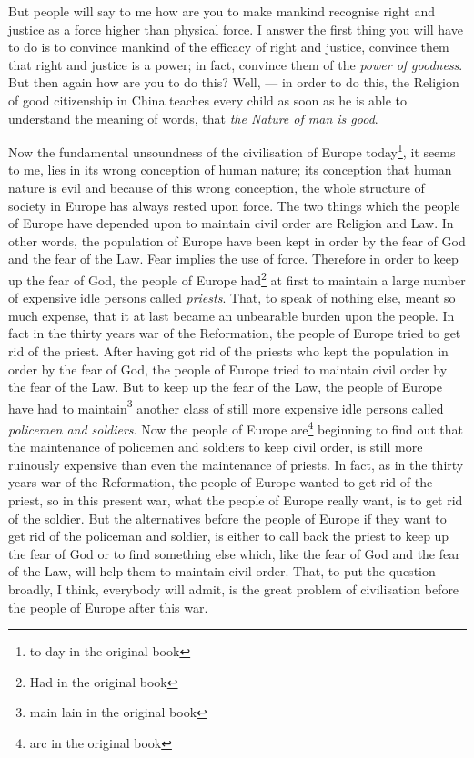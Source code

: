 But people will say to me how are you to make mankind recognise right and justice as a force higher than physical force.
I answer the first thing you will have to do is to convince mankind of the efficacy of right and justice, convince them that right and justice is a power; in fact, convince them of the \emph{power of goodness}.
But then again how are you to do this?
Well, --- in order to do this, the Religion of good citizenship in China teaches every child as soon as he is able to understand the meaning of words, that \emph{the Nature of man is good}\cite{num12}.

Now the fundamental unsoundness of the civilisation of Europe today\footnote{to-day in the original book}, it seems to me, lies in its wrong conception of human nature; its conception that human nature is evil and because of this wrong conception, the whole structure of society in Europe has always rested upon force.
The two things which the people of Europe have depended upon to maintain civil order are Religion and Law.
In other words, the population of Europe have been kept in order by the fear of God and the fear of the Law.
Fear implies the use of force.
Therefore in order to keep up the fear of God, the people of Europe had\footnote{Had in the original book} at first to maintain a large number of expensive idle persons called \emph{priests}.
That, to speak of nothing else, meant so much expense, that it at last became an unbearable burden upon the people.
In fact in the thirty years war of the Reformation, the people of Europe tried to get rid of the priest.
After having got rid of the priests who kept the population in order by the fear of God, the people of Europe tried to maintain civil order by the fear of the Law.
But to keep up the fear of the Law, the people of Europe have had to maintain\footnote{main lain in the original book} another class of still more expensive idle persons called \emph{policemen and soldiers}.
Now the people of Europe are\footnote{arc in the original book} beginning to find out that the maintenance of policemen and soldiers to keep civil order, is still more ruinously expensive than even the maintenance of priests.
In fact, as in the thirty years war of the Reformation, the people of Europe wanted to get rid of the priest, so in this present war, what the people of Europe really want, is to get rid of the soldier.
But the alternatives before the people of Europe if they want to get rid of the policeman and soldier, is either to call back the priest to keep up the fear of God or to find something else which, like the fear of God and the fear of the Law, will help them to maintain civil order.
That, to put the question broadly, I think, everybody will admit, is the great problem of civilisation before the people of Europe after this war.

